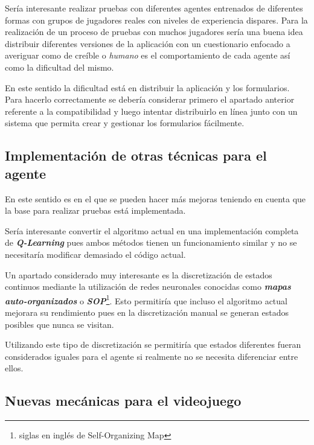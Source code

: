 Sería interesante realizar pruebas con diferentes agentes entrenados de diferentes formas con grupos de jugadores reales con niveles de experiencia dispares. Para la realización de un proceso de pruebas con muchos jugadores sería una buena idea distribuir diferentes versiones de la aplicación con un cuestionario enfocado a averiguar como de creíble o \textit{humano} es el comportamiento de cada agente así como la dificultad del mismo.

\bigskip

En este sentido la dificultad está en distribuir la aplicación y los formularios. Para hacerlo correctamente se debería considerar primero el apartado anterior referente a la compatibilidad y luego intentar distribuirlo en línea junto con un sistema que permita crear y gestionar los formularios fácilmente.

\subsection{Implementación de otras técnicas para el agente}

En este sentido es en el que se pueden hacer más mejoras teniendo en cuenta que la base para realizar pruebas está implementada.

\bigskip

Sería interesante convertir el algoritmo actual en una implementación completa de \textbf{\textit{Q-Learning}} pues ambos métodos tienen un funcionamiento similar y no se necesitaría modificar demasiado el código actual.

\bigskip

Un apartado considerado muy interesante es la discretización de estados continuos mediante la utilización de redes neuronales conocidas como \textit{\textbf{mapas auto-organizados}} o \textbf{\textit{SOP}}\footnote{siglas en inglés de Self-Organizing Map}. Esto permitiría que incluso el algoritmo actual mejorara su rendimiento pues en la discretización manual se generan estados posibles que nunca se visitan.

\bigskip

Utilizando este tipo de discretización se permitiría que estados diferentes fueran considerados iguales para el agente si realmente no se necesita diferenciar entre ellos.

\subsection{Nuevas mecánicas para el videojuego}

